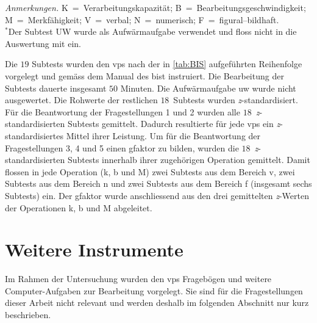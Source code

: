 \documentclass[11pt, twoside, a4paper]{book}		%
\begin{document}
\begin{sidewaystable}
\begin{adjustbox}{width=\textwidth,totalheight=.9\textheight,keepaspectratio}
\begin{threeparttable}
\begin{tabular}{l l c c c c p{.0001cm} c c c p{20cm}}
				\hline

			\end{tabular}
			
			\begin{tablenotes}[flushleft]
				\footnotesize				%
				\setlength{}	%
				\item \textit{Anmerkungen.} K~=~Verarbeitungskapazität; B~=~Bearbeitungsgeschwindigkeit; M~=~Merkfähigkeit; V~=~verbal; N~=~numerisch; F~=~figural--bildhaft.\\
				{$^*$}Der Subtest UW wurde als Aufwärmaufgabe verwendet und floss nicht in die Auswertung mit ein.
			\end{tablenotes}
		\end{threeparttable}
	\end{adjustbox}
\end{sidewaystable}

Die $19$ Subtests wurden den \glspl{vp} nach der in \autoref{tab:BIS} aufgeführten Reihenfolge vorgelegt und gemäss dem Manual des \gls{bist} instruiert. 
Die Bearbeitung der Subtests dauerte insgesamt $50$ Minuten.
Die Aufwärmaufgabe \gls{uw} wurde nicht ausgewertet. Die Rohwerte der restlichen $18$~Subtests wurden \textit{z}-standardisiert. 
Für die Beantwortung der Fragestellungen 1 und 2 wurden alle $18$~\textit{z}-stand\-ard\-isier\-ten Subtests gemittelt. Dadurch resultierte für jede \glspl{vp} ein \textit{z}-standardisiertes Mittel ihrer Leistung. 
Um für die Beantwortung der Fragestellungen 3, 4 und 5 einen \gls{gfaktor} zu bilden, wurden die $18$~\textit{z}-standardisierten Subtests innerhalb ihrer zugehörigen Operation gemittelt. Damit flossen in jede Operation (\gls{k}, \gls{b} und \gls{M}) zwei Subtests aus dem Bereich \gls{v}, zwei Subtests aus dem Bereich \gls{n} und zwei Subtests aus dem Bereich \gls{f} (insgesamt sechs Subtests) ein. Der \gls{gfaktor} wurde anschliessend aus den drei gemittelten \textit{z}-Werten der Operationen \gls{k}, \gls{b} und \gls{M} abgeleitet.


\section{Weitere Instrumente}

Im Rahmen der Untersuchung wurden den \glspl{vp} Fragebögen und weitere Com\-put\-er-Auf\-gaben zur Bearbeitung vorgelegt. Sie sind für die Fragestellungen dieser Arbeit nicht relevant und werden deshalb im folgenden Abschnitt nur kurz beschrieben.
\end{document}
